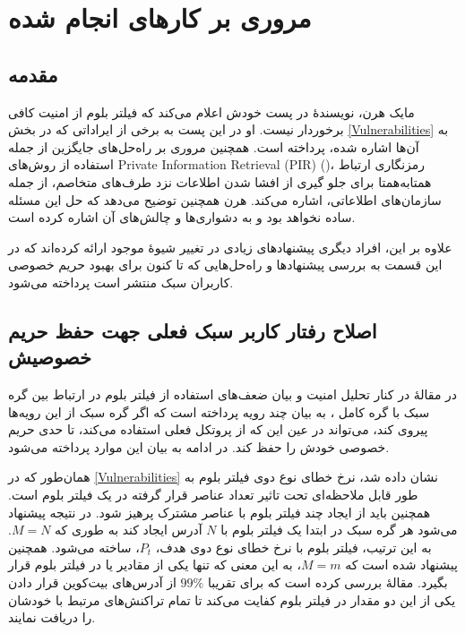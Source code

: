\chapter{مروری بر کار‌های انجام شده}
\label{LitReview}
\section{مقدمه}

مایک هرن، نویسندهٔ  \cite{Hearn2013}
در پست \cite{Hearn2015} خودش اعلام می‌کند که فیلتر بلوم از امنیت کافی برخوردار نیست. او در این پست به برخی از ایراداتی که در بخش \ref{Vulnerabilities} به آن‌ها اشاره شده، پرداخته است. همچنین مروری بر راه‌حل‌های جایگزین از جمله استفاده از روش‌های 
\gls{Private Information Retrieval (PIR)}
()، رمزنگاری ارتباط همتا‌به‌همتا برای جلو گیری از افشا شدن اطلاعات نزد طرف‌های متخاصم، از جمله سازمان‌های اطلاعاتی، اشاره می‌کند. هرن همچنین توضیح می‌دهد که حل این مسئله ساده نخواهد بود و به دشواری‌ها و چالش‌های آن اشاره کرده است\cite{Hearn2015}.

علاوه بر این، افراد دیگری پیشنهاد‌های زیادی در تغییر شیوهٔ موجود ارائه کرده‌اند که در این قسمت به بررسی پیشنهاد‌ها و راه‌حل‌هایی که تا کنون برای بهبود حریم خصوصی کاربران سبک منتشر است پرداخته می‌شود. 


\section{
اصلاح رفتار کاربر سبک فعلی جهت حفظ حریم خصوصیش
}
\label{change_behaviour}
در مقالهٔ \cite{Gervais2014} در کنار تحلیل امنیت و بیان ضعف‌های استفاده از فیلتر بلوم در ارتباط بین گره سبک با گره کامل \cite{Hearn2013}، به بیان چند رویه پرداخته است که اگر گره سبک از این رویه‌ها پیروی کند، می‌تواند در عین این که از پروتکل فعلی استفاده می‌کند، تا حدی حریم خصوصی خودش را حفظ کند. در ادامه به بیان این موارد پرداخته می‌شود.

	همان‌طور که در \ref{Vulnerabilities} نشان داده شد، نرخ خطای نوع دوی فیلتر بلوم به طور قابل ملاحظه‌ای تحت تاثیر تعداد عناصر قرار گرفته در یک فیلتر بلوم است. همچنین باید از ایجاد چند فیلتر بلوم با عناصر مشترک پرهیز شود. در نتیجه پیشنهاد می‌شود هر گره سبک در ابتدا یک فیلتر بلوم با $N$ آدرس ایجاد کند به طوری که $M=N$. به این ترتیب، فیلتر بلوم با نرخ خطای نوع دوی هدف، $P_t$، ساخته می‌شود. همچنین پیشنهاد شده است که $M=m$، به این معنی که تنها یکی از مقادیر  یا  در فیلتر بلوم قرار بگیرد. مقالهٔ \cite{Gervais2014} بررسی کرده است که برای تقریبا $99\%$ از آدرس‌های بیت‌کوین قرار دادن یکی از این دو مقدار در فیلتر بلوم کفایت می‌کند تا تمام تراکنش‌های مرتبط  با خودشان را دریافت نمایند.
	
